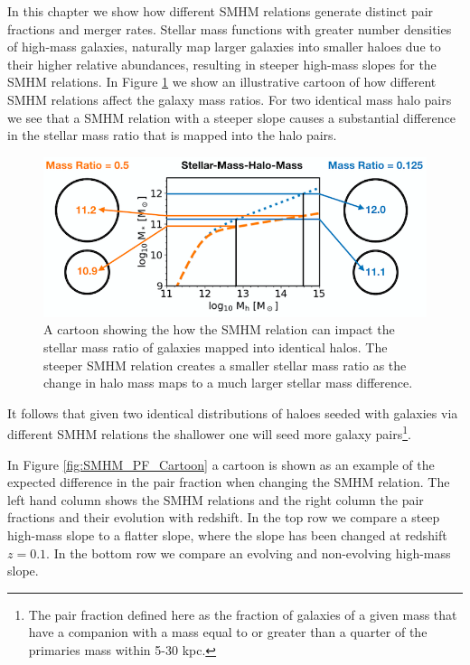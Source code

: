 
In this chapter we show how different SMHM relations generate distinct pair fractions and merger rates. 
Stellar mass functions with greater number densities of high-mass galaxies, naturally map larger galaxies into smaller haloes due to their higher relative abundances, resulting in steeper high-mass slopes for the SMHM relations.
In Figure \ref{fig:MassRatioCartoon} we show an illustrative cartoon of how different SMHM relations affect the galaxy mass ratios. 
For two identical mass halo pairs we see that a SMHM relation with a steeper slope causes a substantial difference in the stellar mass ratio that is mapped into the halo pairs. 

\begin{figure}[h]
	\centering
	\includegraphics[width = \linewidth]{Figures/Chapter5/MassRatioCartoon.png}
	\caption{A cartoon showing the how the SMHM relation can impact the stellar mass ratio of galaxies mapped into identical halos. The steeper SMHM relation creates a smaller stellar mass ratio as the change in halo mass maps to a much larger stellar mass difference.}
	\label{fig:MassRatioCartoon}
\end{figure}

It follows that given two identical distributions of haloes seeded with galaxies via different SMHM relations the shallower one will seed more galaxy pairs\footnote{The pair fraction  defined here as the fraction of galaxies of a given mass that have a companion with a mass equal to or greater than a quarter of the primaries mass within 5-30 kpc.}.

In Figure \ref{fig:SMHM_PF_Cartoon} a cartoon is shown as an example of the expected difference in the pair fraction when changing the SMHM relation.
The left hand column shows the SMHM relations and the right column the pair fractions and their evolution with redshift. 
In the top row we compare a steep high-mass slope to a flatter slope, where the slope has been changed at redshift $z = 0.1$.
In the bottom row we compare an evolving and non-evolving high-mass slope.

